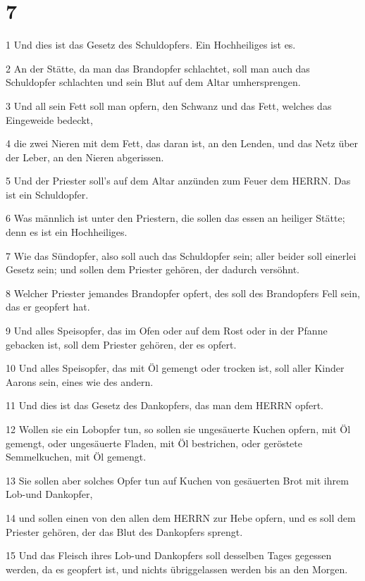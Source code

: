 \chapter{7}

\par 1 Und dies ist das Gesetz des Schuldopfers. Ein Hochheiliges ist es.
\par 2 An der Stätte, da man das Brandopfer schlachtet, soll man auch das Schuldopfer schlachten und sein Blut auf dem Altar umhersprengen.
\par 3 Und all sein Fett soll man opfern, den Schwanz und das Fett, welches das Eingeweide bedeckt,
\par 4 die zwei Nieren mit dem Fett, das daran ist, an den Lenden, und das Netz über der Leber, an den Nieren abgerissen.
\par 5 Und der Priester soll's auf dem Altar anzünden zum Feuer dem HERRN. Das ist ein Schuldopfer.
\par 6 Was männlich ist unter den Priestern, die sollen das essen an heiliger Stätte; denn es ist ein Hochheiliges.
\par 7 Wie das Sündopfer, also soll auch das Schuldopfer sein; aller beider soll einerlei Gesetz sein; und sollen dem Priester gehören, der dadurch versöhnt.
\par 8 Welcher Priester jemandes Brandopfer opfert, des soll des Brandopfers Fell sein, das er geopfert hat.
\par 9 Und alles Speisopfer, das im Ofen oder auf dem Rost oder in der Pfanne gebacken ist, soll dem Priester gehören, der es opfert.
\par 10 Und alles Speisopfer, das mit Öl gemengt oder trocken ist, soll aller Kinder Aarons sein, eines wie des andern.
\par 11 Und dies ist das Gesetz des Dankopfers, das man dem HERRN opfert.
\par 12 Wollen sie ein Lobopfer tun, so sollen sie ungesäuerte Kuchen opfern, mit Öl gemengt, oder ungesäuerte Fladen, mit Öl bestrichen, oder geröstete Semmelkuchen, mit Öl gemengt.
\par 13 Sie sollen aber solches Opfer tun auf Kuchen von gesäuerten Brot mit ihrem Lob-und Dankopfer,
\par 14 und sollen einen von den allen dem HERRN zur Hebe opfern, und es soll dem Priester gehören, der das Blut des Dankopfers sprengt.
\par 15 Und das Fleisch ihres Lob-und Dankopfers soll desselben Tages gegessen werden, da es geopfert ist, und nichts übriggelassen werden bis an den Morgen.
